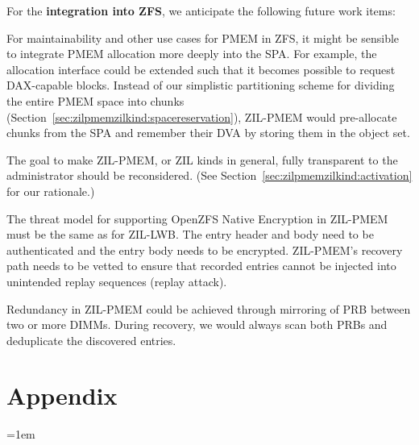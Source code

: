 \documentclass[12pt,a4paper,twoside]{book}
\begin{document}
For the \textbf{integration into ZFS}, we anticipate the following future work items:
\begin{description}[noitemsep,leftmargin=1.5cm,labelindent=1cm]
    \item[PMEM Space Management] For maintainability and other use cases for PMEM in ZFS, it might be sensible to integrate PMEM allocation more deeply into the SPA.
        For example, the allocation interface could be extended such that it becomes possible to request DAX-capable blocks.
        Instead of our simplistic partitioning scheme for dividing the entire PMEM space into chunks (Section~\ref{sec:zilpmemzilkind:spacereservation}), ZIL-PMEM would pre-allocate chunks from the SPA and remember their DVA by storing them in the object set.

    \item[ZIL Kinds User Experience] The goal to make ZIL-PMEM, or ZIL kinds in general, fully transparent to the administrator should be reconsidered.
        (See Section~\ref{sec:zilpmemzilkind:activation} for our rationale.)

    \item[Support for Native Encryption] The threat model for supporting \mbox{OpenZFS} Native Encryption in ZIL-PMEM must be the same as for ZIL-LWB.
        The entry header and body need to be authenticated and the entry body needs to be encrypted.
        ZIL-PMEM's recovery path needs to be vetted to ensure that recorded entries cannot be injected into unintended replay sequences (replay attack).

    \item[Redundancy Through Mirroring] Redundancy in ZIL-PMEM could be achieved through mirroring of PRB between two or more DIMMs.
        During recovery, we would always scan both PRBs and deduplicate the discovered entries.
\end{description}

\backmatter

\chapter{Appendix}\label{ch:appendix}

\cleardoublepage
{}
{}
\emergencystretch=1em
\printbibliography
\end{document}
